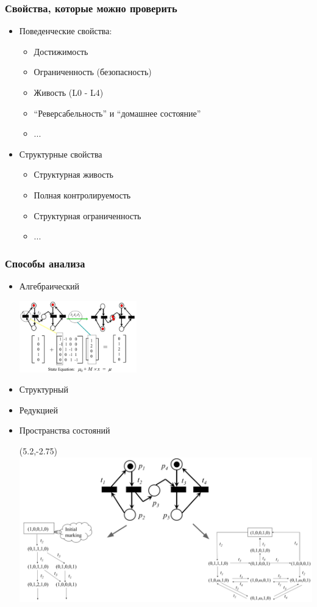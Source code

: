 \documentclass[xetex,mathserif,serif]{beamer}
\begin{document}
	\begin{frame}
		\frametitle{Свойства, которые можно проверить}
		\begin{itemize}
			\item Поведенческие свойства:
			\begin{itemize}
				\item Достижимость
				\item Ограниченность (безопасность)
				\item Живость (L0 - L4)
				\item ``Реверсабельность'' и ``домашнее состояние''
				\item ...
			\end{itemize}
			\item Структурные свойства
			\begin{itemize}
				\item Структурная живость
				\item Полная контролируемость
				\item Структурная ограниченность
				\item ...
			\end{itemize}
		\end{itemize}
	\end{frame}

	\begin{frame}
		\frametitle{Способы анализа}
		\begin{itemize}
			\item Алгебраический

			\includegraphics[width=0.4\textwidth]{petriAlgebraicAnalysis.png}
			\item Структурный
			\item Редукцией
			\item Пространства состояний
			\begin{textblock}{7}(5.2,-2.75)
				\includegraphics[width=\textwidth]{petriStateSpaceAnalysis.png}
			\end{textblock}
		\end{itemize}
	\end{frame}
\end{document}
